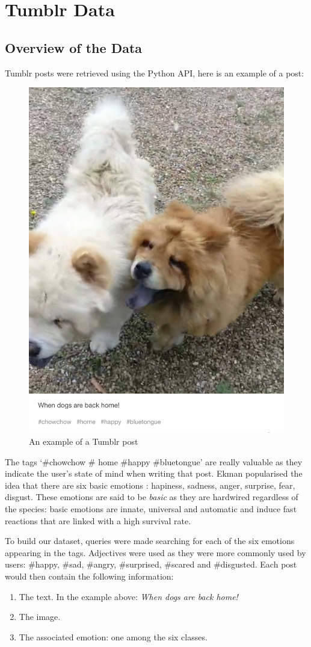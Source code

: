 \chapter{Tumblr Data}

\section{Overview of the Data}
Tumblr posts were retrieved using the Python API, here is an example of a post:
\begin{figure}[H]
\centering
\includegraphics[width=.58\textwidth]{Images/chowchow.png}
\caption{An example of a Tumblr post}
\end{figure}

The tags `\#chowchow \# home \#happy \#bluetongue' are really valuable as they indicate the user's state of mind when writing that post. Ekman popularised the idea that there are six basic emotions \cite{ekman}: hapiness, sadness, anger, surprise, fear, disgust. These emotions are said to be {\em basic} as they are hardwired regardless of the species: basic emotions are innate, universal and automatic and induce fast reactions that are linked with a high survival rate.

To build our dataset, queries were made searching for each of the six emotions appearing in the tags. Adjectives were used as they were more commonly used by users: \#happy, \#sad, \#angry, \#surprised, \#scared and \#disgusted. Each post would then contain the following information:
\begin{enumerate}
\item The text. In the example above: \textit{When dogs are back home!}
\item The image.
\item The associated emotion: one among the six classes.
\end{enumerate}

